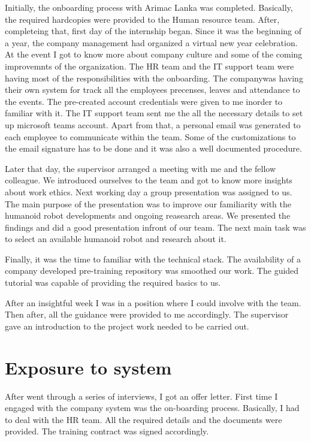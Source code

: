\documentclass[twoside,12pt,times,onecolumn,a4paper]{report}
\begin{document}
\hspace{3em} Initially, the onboarding process with Arimac Lanka was completed. Basically, the required hardcopies were provided to the Human resource team. After, completeing that, first day of the internship began. Since it was the beginning of a year, the company management had organized a virtual new year celebration. At the event I got to know more about company culture and some of the coming improvemnts of the organization. The HR team and the IT support team were having most of the responsibilities with the onboarding. The companywas having their own system for track all the employees precenses, leaves and attendance to the events. The pre-created account credentials were given to me inorder to familiar with it. The IT support team sent me the all the necessary details to set up microsoft teams account. Apart from that, a personal email was generated to each employee to communicate within the team. Some of the customizations to the email signature has to be done and it was also a well documented procedure.

Later that day, the supervisor arranged a meeting with me and the fellow colleague. We introduced ourselves to the team and got to know more insights about work ethics. Next working day a group presentation was assigned to us. The main purpose of the presentation was to improve our familiarity with the humanoid robot developments and ongoing reasearch areas. We presented the findings and did a good presentation infront of our team. The next main task was to select an available humanoid robot and research about it. 

Finally, it was the time to familiar with the technical stack. The availability of a company developed pre-training repository was smoothed our work. The guided tutorial was capable of providing the required basics to us. 

After an insightful week I was in a position where I could involve with the team. Then after, all the guidance were provided to me accordingly. The supervisor gave an introduction to the project work needed to be carried out. 


\chapter{Exposure to system}


\hspace{3em} After went through a series of interviews, I got an offer letter. First time I engaged with the company system was the on-boarding process. Basically, I had to deal with the HR team. All the required details and the documents were provided. The training contract was signed accordingly.
\end{document}
